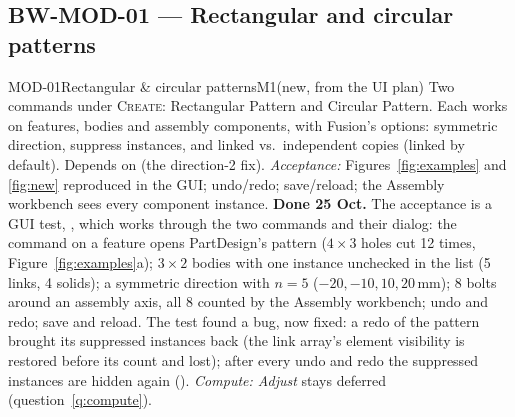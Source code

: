 \subsection{BW-MOD-01 --- Rectangular and circular patterns}\label{sec:patterns}

\begin{epic}{MOD-01}{Rectangular \& circular patterns}{M1}{\stDone}{(new, from the UI plan)}
Two commands under \textsc{Create}: Rectangular Pattern and Circular Pattern. Each works on features,
bodies and assembly components, with Fusion's options: symmetric direction, suppress instances, and linked
vs.\ independent copies (linked by default). Depends on  (the direction-2 fix).
\emph{Acceptance:} Figures~\ref{fig:examples} and \ref{fig:new} reproduced in the GUI; undo/redo;
save/reload; the Assembly workbench sees every component instance.
\textbf{Done 25 Oct.} The acceptance is a GUI test, , which works
through the two commands and their dialog: the command on a feature opens PartDesign's pattern ($4\times3$ holes cut
12 times, Figure~\ref{fig:examples}a); $3\times2$ bodies with one instance unchecked in the list (5 links, 4 solids);
a symmetric direction with $n=5$ ($-20,-10,10,20$\,mm); 8 bolts around an assembly axis, all 8 counted by the
Assembly workbench; undo and redo; save and reload. The test found a bug, now fixed: a redo of the pattern brought its
suppressed instances back (the link array's element visibility is restored before its count and lost); after every
undo and redo the suppressed instances are hidden again ().
\emph{Compute: Adjust} stays deferred (question~\ref{q:compute}).
\end{epic}

